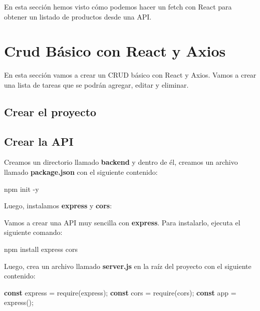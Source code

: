 \documentclass[
  a4paper,
  DIV=11,
  numbers=noendperiod,
  onepage,
  openany]{scrreprt}
\newenvironment{Shaded}{\begin{snugshade}}{\end{snugshade}}
\newcommand{\AttributeTok}[1]{\textcolor[rgb]{0.40,0.45,0.13}{#1}}
\newcommand{\ExtensionTok}[1]{\textcolor[rgb]{0.00,0.23,0.31}{#1}}
\newcommand{\FunctionTok}[1]{\textcolor[rgb]{0.28,0.35,0.67}{#1}}
\newcommand{\KeywordTok}[1]{\textcolor[rgb]{0.00,0.23,0.31}{\textbf{#1}}}
\newcommand{\NormalTok}[1]{\textcolor[rgb]{0.00,0.23,0.31}{#1}}
\newcommand{\OperatorTok}[1]{\textcolor[rgb]{0.37,0.37,0.37}{#1}}
\newcommand{\PreprocessorTok}[1]{\textcolor[rgb]{0.68,0.00,0.00}{#1}}
\newcommand{\StringTok}[1]{\textcolor[rgb]{0.13,0.47,0.30}{#1}}
\begin{document}
\begin{tcolorbox}
En esta sección hemos visto cómo podemos hacer un fetch con React para
obtener un listado de productos desde una API.

\chapter{Crud Básico con React y
Axios}\label{crud-buxe1sico-con-react-y-axios}

En esta sección vamos a crear un CRUD básico con React y Axios. Vamos a
crear una lista de tareas que se podrán agregar, editar y eliminar.

\section{Crear el proyecto}\label{crear-el-proyecto}

\section{Crear la API}\label{crear-la-api}

Creamos un directorio llamado \textbf{backend} y dentro de él, creamos
un archivo llamado \textbf{package.json} con el siguiente contenido:

\begin{Shaded}
\begin{Highlighting}[]
\ExtensionTok{npm}\NormalTok{ init }\AttributeTok{{-}y}
\end{Highlighting}
\end{Shaded}

Luego, instalamos \textbf{express} y \textbf{cors}:

Vamos a crear una API muy sencilla con \textbf{express}. Para
instalarlo, ejecuta el siguiente comando:

\begin{Shaded}
\begin{Highlighting}[]
\ExtensionTok{npm}\NormalTok{ install express cors}
\end{Highlighting}
\end{Shaded}

Luego, crea un archivo llamado \textbf{server.js} en la raíz del
proyecto con el siguiente contenido:

\begin{Shaded}
\begin{Highlighting}[]
\KeywordTok{const}\NormalTok{ express }\OperatorTok{=} \PreprocessorTok{require}\NormalTok{(}\StringTok{\textquotesingle{}express\textquotesingle{}}\NormalTok{)}\OperatorTok{;}
\KeywordTok{const}\NormalTok{ cors }\OperatorTok{=} \PreprocessorTok{require}\NormalTok{(}\StringTok{\textquotesingle{}cors\textquotesingle{}}\NormalTok{)}\OperatorTok{;}
\KeywordTok{const}\NormalTok{ app }\OperatorTok{=} \FunctionTok{express}\NormalTok{()}\OperatorTok{;}


\end{Highlighting}
\end{Shaded}
\end{tcolorbox}
\end{document}
